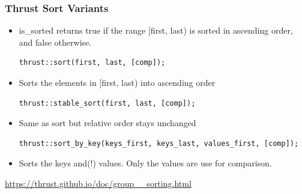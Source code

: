 \documentclass[aspectratio=169,handout]{beamer}
\begin{document}
 	
\begin{frame}[fragile]
\frametitle{Thrust Sort Variants}

\begin{itemize}
\begin{lstlisting}
thrust::is_sorted(first, last);		
\end{lstlisting}
	\item is\_sorted returns true if the range [first, last) is sorted in ascending order, and false otherwise.
\begin{lstlisting}
thrust::sort(first, last, [comp]);		
\end{lstlisting}
\item Sorts the elements in [first, last) into ascending order
\begin{lstlisting}
thrust::stable_sort(first, last, [comp]);		
\end{lstlisting}
\item Same as sort but relative order stays unchanged
\begin{lstlisting}
thrust::sort_by_key(keys_first, keys_last, values_first, [comp]);
\end{lstlisting}
\item Sorts the keys and(!) values. Only the values are use for comparison.
\end{itemize}
\url{https://thrust.github.io/doc/group__sorting.html}
\end{frame}

\end{document}
